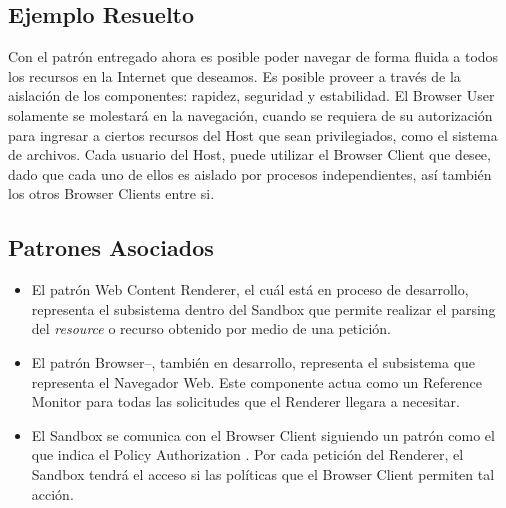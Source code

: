 \subsection{Ejemplo Resuelto}
Con el patrón entregado ahora es posible poder navegar de forma fluida a todos los recursos en la Internet que deseamos. Es posible proveer a través de la aislación de los componentes: rapidez, seguridad y estabilidad. El Browser User solamente se molestará en la navegación, cuando se requiera de su autorización para ingresar a ciertos recursos del Host que sean privilegiados, como el sistema de archivos. Cada usuario del Host, puede utilizar el Browser Client que desee, dado que cada uno de ellos es aislado por procesos independientes, así también los otros Browser Clients entre si.


\subsection{Patrones Asociados}
\begin{itemize}
	\item El patrón Web Content Renderer, el cuál está en proceso de desarrollo, representa el subsistema dentro del Sandbox que permite realizar el parsing del \textit{resource} o recurso obtenido por medio de una petición.
	\item El patrón Browser--, también en desarrollo, representa el subsistema que representa el Navegador Web. Este componente actua como un Reference Monitor \cite{fernandez2013security} para todas las solicitudes que el Renderer llegara a necesitar.
	\item El Sandbox se comunica con el Browser Client siguiendo un patrón como el que indica el Policy Authorization \cite{fernandez2013security}. Por cada petición del Renderer, el Sandbox tendrá el acceso si las políticas que el Browser Client permiten tal acción.
\end{itemize}
